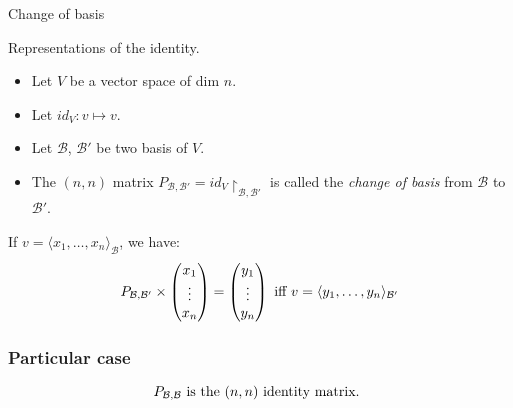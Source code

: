 \documentclass{beamer}
\begin{document}
\begin{frame}{Change of basis}
  \begin{block}{Representations of the identity.}
    \begin{itemize}
    \item  Let $V$ be a vector space of dim $n$.
    \item Let $id_{V} : v \mapsto v$.
    \item Let $\mathcal{B}$, $\mathcal{B}'$ be two basis of $V$.
    \item The $(n,n)$ matrix $P_{\mathcal{B}, \mathcal{B}'} = id_{V} \restriction_{\mathcal{B}, \mathcal{B'}}$ is called the \emph{change of basis} from $\mathcal{B}$ to $\mathcal{B}'$.
    \end{itemize}
    If $v = \langle x_1, \dots, x_n \rangle_{\mathcal{B}}$, we have:
    \[ P_{\mathcal{B}, \mathcal{B}'} \times \begin{pmatrix} x_1 \\\vdots\\x_n \end{pmatrix} = \begin{pmatrix} y_1 \\\vdots\\y_n \end{pmatrix} \textnormal{ iff } v = \langle y_1, \dots, y_n \rangle_{\mathcal{B}'}  \]
    
  \end{block}  
\end{frame}

\begin{frame}
  \frametitle{Particular case}
  \[P_{\mathcal{B}, \mathcal{B}} \textnormal{ is the } (n,n) \textnormal{ identity matrix. } \]
\end{frame}
\end{document}
